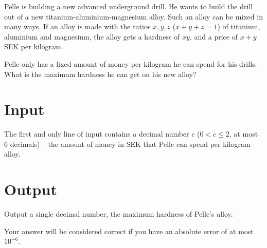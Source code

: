 Pelle is building a new advanced underground drill.
He wants to build the drill out of a new titanium-aluminium-magnesium alloy.
Such an alloy can be mixed in many ways.
If an alloy is made with the ratios $x, y, z$ ($x + y + z = 1$) of titanium, aluminium and magnesium, the alloy gets a hardness of $xy$, and a price of $x + y$ SEK per kilogram.

Pelle only has a fixed amount of money per kilogram he can spend for his drills.
What is the maximum hardness he can get on his new alloy?

\section*{Input}
The first and only line of input contains a decimal number $c$ ($0 < c \le 2$, at most 6 decimals) -- the amount of money in SEK that Pelle can spend per kilogram alloy.

\section*{Output}
Output a single decimal number, the maximum hardness of Pelle's alloy.

Your answer will be considered correct if you have an absolute error of at most ${10}^{-6}$.
